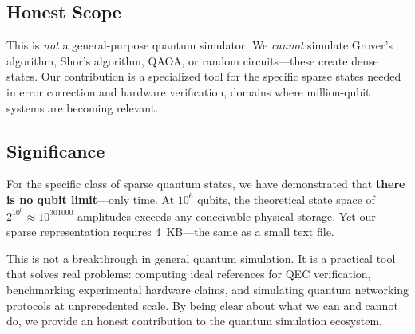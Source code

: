 \documentclass[11pt,twocolumn]{article}
\begin{document}
\subsection{Honest Scope}

This is \emph{not} a general-purpose quantum simulator. We \emph{cannot} simulate Grover's algorithm, Shor's algorithm, QAOA, or random circuits---these create dense states. Our contribution is a specialized tool for the specific sparse states needed in error correction and hardware verification, domains where million-qubit systems are becoming relevant.

\subsection{Significance}

For the specific class of sparse quantum states, we have demonstrated that \textbf{there is no qubit limit}---only time. At $10^6$ qubits, the theoretical state space of $2^{10^6} \approx 10^{301000}$ amplitudes exceeds any conceivable physical storage. Yet our sparse representation requires 4~KB---the same as a small text file.

This is not a breakthrough in general quantum simulation. It is a practical tool that solves real problems: computing ideal references for QEC verification, benchmarking experimental hardware claims, and simulating quantum networking protocols at unprecedented scale. By being clear about what we can and cannot do, we provide an honest contribution to the quantum simulation ecosystem.

\end{document}
